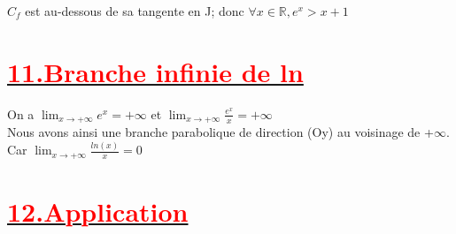 \documentclass[12pt,a4paper]{article}
\begin{document}

$C_{f}$ est au-dessous de sa tangente en J; donc $\forall x \in \mathbb{R}, e^{x}>x+1$
\section*{\underline{\textbf{\textcolor{red}{11.Branche infinie de ln}}}}
On a  $\lim_{{x \to +\infty}} e^{x}=+\infty$ et $\lim_{{x \to +\infty}} \frac{e^{x}}{x}=+\infty$\\
Nous avons ainsi une branche parabolique de direction (Oy) au voisinage de +$\infty$.\\
Car $\lim_{{x \to +\infty}} \frac{ln(x)}{x}=0$\\
\section*{\underline{\textbf{\textcolor{red}{12.Application}}}}
\end{document}

